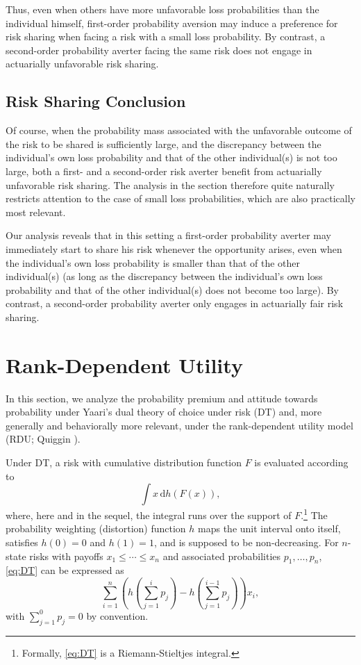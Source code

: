 \documentclass[11pt]{article}
\begin{document}
Thus, even when others have more unfavorable loss probabilities than the individual himself,
first-order probability aversion may induce a preference for 
risk sharing when facing a risk with a small loss probability.
By contrast, a second-order probability averter facing the same risk
does not engage in actuarially unfavorable risk sharing.

\subsection{Risk Sharing Conclusion}

Of course, when the probability mass associated with the unfavorable outcome of the risk to be shared is sufficiently large,
and the discrepancy between the individual's own loss probability and that of the other individual(s) is not too large,
both a first- and a second-order risk averter benefit from actuarially unfavorable risk sharing.
The analysis in the section therefore quite naturally restricts attention to the case of small loss probabilities,
which are also practically most relevant.

Our analysis reveals that in this setting a first-order probability averter may immediately start to share his risk whenever the opportunity arises,
even when the individual's own loss probability is smaller than that of the other individual(s)
(as long as the discrepancy between the individual's own loss probability and that of the other individual(s) does not become too large).
By contrast, a second-order probability averter only engages in actuarially fair risk sharing.


\setcounter{equation}{0}

\section{Rank-Dependent Utility}\label{sec:rdu}

In this section, we analyze the probability premium and attitude towards probability
under Yaari's \cite{Y87} dual theory of choice under risk (DT) and,
more generally and behaviorally more relevant, under the rank-dependent utility model (RDU; Quiggin \cite{Q82}).

Under DT,
a risk with cumulative distribution function $F$ is evaluated according to
\begin{equation}
\int x \,\mathrm{d}h\left(F(x)\right),
\label{eq:DT}
\end{equation}
where, here and in the sequel, the integral runs over the support of $F$.\footnote{Formally, \eqref{eq:DT} is a Riemann-Stieltjes integral.}
The probability weighting (distortion) function $h$ maps the unit interval onto itself,
satisfies $h(0)=0$ and $h(1)=1$, and is supposed to be non-decreasing.
For $n$-state risks with payoffs $x_{1}\leq\cdots\leq x_{n}$
and associated probabilities $p_{1},\ldots,p_{n}$,
\eqref{eq:DT} can be expressed as
\begin{equation*}
\sum_{i=1}^{n}\left(h\left(\sum_{j=1}^{i}p_{j}\right)-h\left(\sum_{j=1}^{i-1}p_{j}\right)\right)x_{i},
\end{equation*}
with $\sum_{j=1}^{0}p_{j}=0$ by convention.
\end{document}
